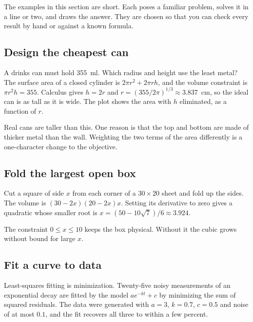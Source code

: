 The examples in this section are short. Each poses a familiar problem, solves it
in a line or two, and draws the answer. They are chosen so that you can check
every result by hand or against a known formula.

\subsection*{Design the cheapest can}

A drinks can must hold 355~ml. Which radius and height use the least metal? The
surface area of a closed cylinder is \(2\pi r^2 + 2\pi r h\), and the volume
constraint is \(\pi r^2 h = 355\). Calculus gives \(h = 2r\) and
\(r = (355/2\pi)^{1/3} \approx 3.837\)~cm, so the ideal can is as tall as it is
wide. The plot shows the area with \(h\) eliminated, as a function of \(r\).


Real cans are taller than this. One reason is that the top and bottom are made
of thicker metal than the wall. Weighting the two terms of the area differently is a
one-character change to the objective.

\subsection*{Fold the largest open box}

Cut a square of side \(x\) from each corner of a \(30 \times 20\) sheet and fold
up the sides. The volume is \((30 - 2x)(20 - 2x)x\). Setting its derivative to
zero gives a quadratic whose smaller root is
\(x = (50 - 10\sqrt7)/6 \approx 3.924\).


The constraint \(0 \le x \le 10\) keeps the box physical. Without it the cubic
grows without bound for large \(x\).

\subsection*{Fit a curve to data}

Least-squares fitting is minimization. Twenty-five noisy measurements of an
exponential decay are fitted by the model \(a e^{-kt} + c\) by minimizing the
sum of squared residuals. The data were generated with \(a = 3\), \(k = 0.7\),
\(c = 0.5\) and noise of at most \(0.1\), and the fit recovers all three to
within a few percent.

